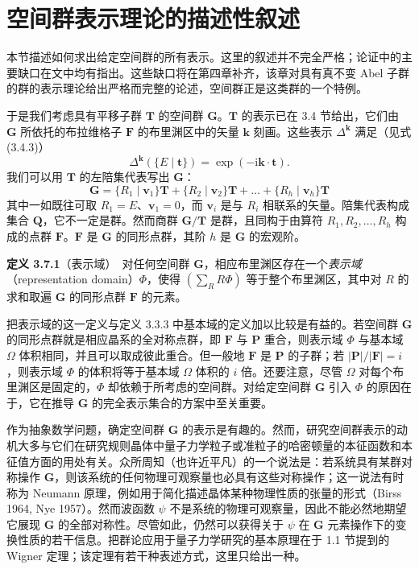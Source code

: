 \section{空间群表示理论的描述性叙述}

本节描述如何求出给定空间群的所有表示。这里的叙述并不完全严格；论证中的主要缺口在文中均有指出。这些缺口将在第四章补齐，该章对具有真不变 Abel 子群的群的表示理论给出严格而完整的论述，空间群正是这类群的一个特例。

于是我们考虑具有平移子群 $\mathbf{T}$ 的空间群 $\mathbf{G}$。$\mathbf{T}$ 的表示已在 3.4 节给出，它们由 $\mathbf{G}$ 所依托的布拉维格子 $\mathbf{F}$ 的布里渊区中的矢量 $\mathbf{k}$ 刻画。这些表示 $\Delta^{\mathbf{k}}$ 满足（见式 (3.4.3)）
\begin{equation*}
\Delta^{\mathbf{k}}(\{E \mid \mathbf{t}\}) = \exp(-\mathrm{i}\mathbf{k} \cdot \mathbf{t}).
\tag{3.7.1}
\end{equation*}
我们可以用 $\mathbf{T}$ 的左陪集代表写出 $\mathbf{G}$：
\begin{equation*}
\mathbf{G} = \{R_{1} \mid \mathbf{v}_{1}\}\mathbf{T} + \{R_{2} \mid \mathbf{v}_{2}\}\mathbf{T} + \dots + \{R_{h} \mid \mathbf{v}_{h}\}\mathbf{T}
\tag{3.5.2}
\end{equation*}
其中一如既往可取 $R_{1} = E$、$\mathbf{v}_{1} = 0$，而 $\mathbf{v}_{i}$ 是与 $R_{i}$ 相联系的矢量。陪集代表构成集合 $\mathbf{Q}$，它不一定是群。然而商群 $\mathbf{G}/\mathbf{T}$ 是群，且同构于由算符 $R_{1}, R_{2}, \dots, R_{h}$ 构成的点群 $\mathbf{F}$。$\mathbf{F}$ 是 $\mathbf{G}$ 的同形点群，其阶 $h$ 是 $\mathbf{G}$ 的宏观阶。

\noindent\textbf{定义 3.7.1}\quad （表示域）\ 对任何空间群 $\mathbf{G}$，相应布里渊区存在一个\textit{表示域}（representation domain）$\Phi$，使得 $(\sum_{R} R\Phi)$ 等于整个布里渊区，其中对 $R$ 的求和取遍 $\mathbf{G}$ 的同形点群 $\mathbf{F}$ 的元素。

把表示域的这一定义与定义 3.3.3 中基本域的定义加以比较是有益的。若空间群 $\mathbf{G}$ 的同形点群就是相应晶系的全对称点群，即 $\mathbf{F}$ 与 $\mathbf{P}$ 重合，则表示域 $\Phi$ 与基本域 $\Omega$ 体积相同，并且可以取成彼此重合。但一般地 $\mathbf{F}$ 是 $\mathbf{P}$ 的子群；若 $|\mathbf{P}|/|\mathbf{F}| = i$，则表示域 $\Phi$ 的体积将等于基本域 $\Omega$ 体积的 $i$ 倍。还要注意，尽管 $\Omega$ 对每个布里渊区是固定的，$\Phi$ 却依赖于所考虑的空间群。对给定空间群 $\mathbf{G}$ 引入 $\Phi$ 的原因在于，它在推导 $\mathbf{G}$ 的完全表示集合的方案中至关重要。

作为抽象数学问题，确定空间群 $\mathbf{G}$ 的表示是有趣的。然而，研究空间群表示的动机大多与它们在研究规则晶体中量子力学粒子或准粒子的哈密顿量的本征函数和本征值方面的用处有关。众所周知（也许近平凡）的一个说法是：若系统具有某群对称操作 $\mathbf{G}$，则该系统的任何物理可观察量也必具有这些对称操作；这一说法有时称为 Neumann 原理，例如用于简化描述晶体某种物理性质的张量的形式（Birss 1964, Nye 1957）。然而波函数 $\psi$ 不是系统的物理可观察量，因此不能必然地期望它展现 $\mathbf{G}$ 的全部对称性。尽管如此，仍然可以获得关于 $\psi$ 在 $\mathbf{G}$ 元素操作下的变换性质的若干信息。把群论应用于量子力学研究的基本原理在于 1.1 节提到的 Wigner 定理；该定理有若干种表述方式，这里只给出一种。

